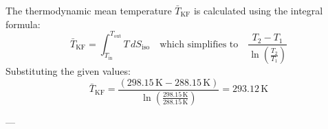 The thermodynamic mean temperature \( \bar{T}_{\text{KF}} \) is calculated using the integral formula:  
\[
\bar{T}_{\text{KF}} = \int_{T_{\text{in}}}^{T_{\text{out}}} T \, dS_{\text{iso}} \quad \text{which simplifies to} \quad \frac{T_2 - T_1}{\ln \left( \frac{T_2}{T_1} \right)}
\]  
Substituting the given values:  
\[
\bar{T}_{\text{KF}} = \frac{(298.15 \, \text{K} - 288.15 \, \text{K})}{\ln \left( \frac{298.15 \, \text{K}}{288.15 \, \text{K}} \right)} = 293.12 \, \text{K}
\]

---
